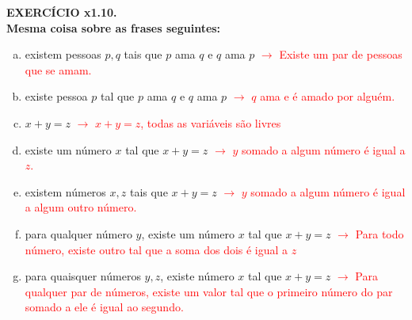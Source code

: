 \documentclass[a4paper, 12pt]{article}
\begin{document}
\noindent \textbf{EXERCÍCIO x1.10. \\
Mesma coisa sobre as frases seguintes:}

\begin{enumerate}[(a)]
    \item existem pessoas $p,q$ tais que $p$ ama $q$ e $q$ ama $p$ \textcolor{red}{$\rightarrow$ Existe um par de pessoas que se amam.}
    \item existe pessoa $p$ tal que $p$ ama $q$ e $q$ ama $p$ \textcolor{red}{$\rightarrow$ $q$ ama e é amado por alguém.}
    \item $x+y=z$ \textcolor{red}{$\rightarrow$ $x+y=z$, todas as variáveis são livres}
    \item existe um número $x$ tal que $x + y = z$ \textcolor{red}{$\rightarrow$ $y$ somado a algum número é igual a $z$.}
    \item existem números $x,z$ tais que $x + y = z$ \textcolor{red}{$\rightarrow$ $y$ somado a algum número é igual a algum outro número.}
    \item para qualquer número $y$, existe um número $x$ tal que $x + y = z$ \textcolor{red}{$\rightarrow$ Para todo número, existe outro tal que a soma dos dois é igual a $z$}
    \item para quaisquer números $y,z$, existe número $x$ tal que $x + y = z$ \textcolor{red}{$\rightarrow$ Para qualquer par de números, existe um valor tal que o primeiro número do par somado a ele é igual ao segundo.}
\end{enumerate}
\end{document}
